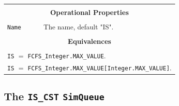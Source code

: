\documentclass[12pt]{book}
\begin{document}
\begin{tabular}{|l|l|l|l|}
\hline
\multicolumn{4}{|c|}{} \\
\multicolumn{4}{|c|}{\bf Operational Properties} \\
\multicolumn{4}{|c|}{} \\
\hline
\lstinline|Name| & \multicolumn{3}{|l|}{The name, default "IS".} \\
\hline
\multicolumn{4}{|c|}{} \\
\multicolumn{4}{|c|}{\bf Equivalences} \\
\multicolumn{4}{|c|}{} \\
\hline
\multicolumn{4}{|l|}{\lstinline|IS| $=$ \lstinline|FCFS_Integer.MAX_VALUE|.} \\
\multicolumn{4}{|l|}{\lstinline|IS| $=$ \lstinline|FCFS_Integer.MAX_VALUE[Integer.MAX_VALUE]|.} \\
\hline
\end{tabular}

\subsection{The \lstinline{IS_CST} \lstinline{SimQueue}}
\label{sec:IS_CST}
\end{document}
